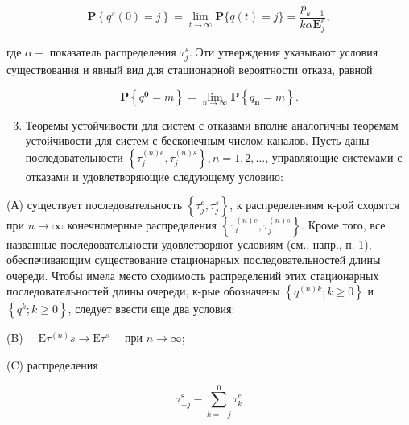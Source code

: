 \documentclass[10pt]{article}
\begin{document}
\[

\mathbf{P}\left\{q^{s}(0)=j\right\}=\lim _{t \rightarrow \infty} \mathbf{P}\{q(t)=j\}=\frac{p_{k-1}}{k \alpha \mathbf{E}_{j}^{e}},

\]



где $\alpha-$ показатель распределения $\tau_{j}^{s}$. Эти утверждения указывают условия существования и явный вид для стационарной вероятности отказа, равной



\[

\mathbf{P}\left\{q^{\mathbf{0}}=m\right\}=\lim _{n \rightarrow \infty} \mathbf{P}\left\{q_{\boldsymbol{n}}=m\right\} .

\]



\begin{enumerate}

  \setcounter{enumi}{2}

  \item Теоремы устойчивости для систем с отказами вполне аналогичны теоремам устойчивости для систем с бесконечным числом каналов. Пусть даны последовательности $\left\{\tau_{j}^{(n) e}, \tau_{j}^{(n) s}\right\}, n=1,2, \ldots$, управляющие системами с отказами и удовлетворяющие следующему условию:

\end{enumerate}



(А) существует последовательность $\left\{\tau_{j}^{e}, \tau_{j}^{s}\right\}$, к распределениям к-рой сходятся при $n \rightarrow \infty$ конечномерные распределения $\left\{\tau_{i}^{(n) e}, \tau_{j}^{(n) s}\right\}$. Кроме того, все названные последовательности удовлетворяют условиям (см., напр., п. 1), обеспечивающим существование стационарных последовательностей длины очереди. Чтобы имела место сходимость распределений этих стационарных последовательностей длины очереди, к-рые обозначены $\left\{q^{(n) k} ; k \geqslant 0\right\}$ и $\left\{q^{k} ; k \geqslant 0\right\}$, следует ввести еще два условия:



(B) $\quad \mathrm{E} \tau^{(n)} s \longrightarrow \mathrm{E} \tau^{s} \quad$ при $n \longrightarrow \infty$;



(C) распределения



\[

\tau_{-j}^{\mathrm{s}}-\sum_{k=-j}^{0} \tau_{k}^{e}

\]
\end{document}
